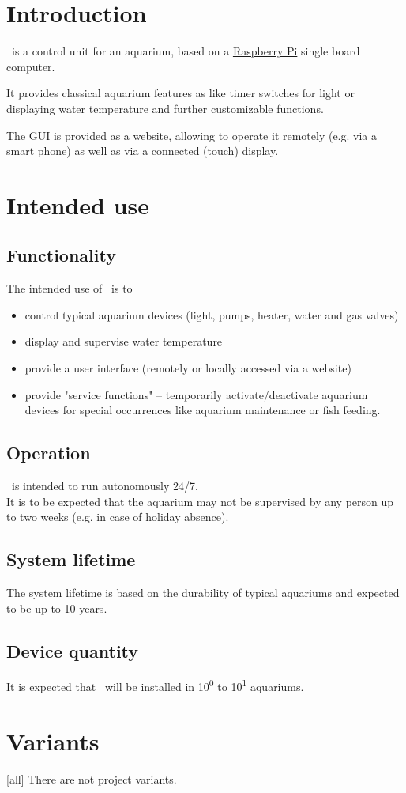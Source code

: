 \documentclass{../../git_submodules/common_docu/doc_class}
\author{\defaultAuthor}
\date{2019-04-04}
\begin{document}
  
  \section{Introduction}
  \ThisProjectName~is a control unit for an aquarium, based on a \hyperref{https://en.wikipedia.org/wiki/Raspberry_Pi}{}{}{Raspberry Pi} single board computer.
  
  It provides classical aquarium features as like timer switches for light or displaying water temperature and further customizable functions.
  
  The GUI is provided as a website, allowing to operate it remotely (e.g. via a smart phone) as well as via a connected (touch) display.
  
  \section{Intended use}
  \subsection{Functionality}
  The intended use of \ThisProjectName~is to 
  \begin{itemize}
    \item control typical aquarium  devices (light, pumps, heater, water and gas valves)
    \item display and supervise water temperature
    \item provide a user interface (remotely or locally accessed via a website)
    \item provide "service functions" -- temporarily activate/deactivate aquarium devices for special occurrences like aquarium maintenance or fish feeding.
  \end{itemize}

  \subsection{Operation}
  \ThisProjectName~is intended to run autonomously 24/7.\\
  It is to be expected that the aquarium may not be supervised by any person up to two weeks (e.g. in case of holiday absence).

  \subsection{System lifetime}
  The system lifetime is based on the durability of typical aquariums and expected to be up to 10 years.
  
  \subsection{Device quantity}
  It is expected that \ThisProjectName~will be installed in 10\textsuperscript{0} to 10\textsuperscript{1} aquariums.
  
  \section{Variants}[all]\label{variant:all}  
  There are not project variants.
  
\end{document}
